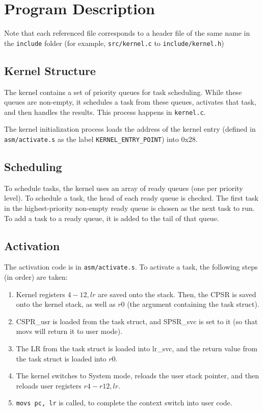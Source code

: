 \documentclass{article}
\begin{document}
\section{Program Description}
Note that each referenced file corresponds to a header file of the same name in the \verb|include| folder (for example, \verb|src/kernel.c| to \verb|include/kernel.h|)
\subsection{Kernel Structure}
The kernel contains a set of priority queues for task scheduling. While these queues are non-empty, it schedules a task from these queues, activates that task, and then handles the results. This process happens in \verb|kernel.c|.

The kernel initialization process loads the address of the kernel entry (defined in \verb|asm/activate.s| as the label \verb|KERNEL_ENTRY_POINT|) into $0$x$28$.
\subsection{Scheduling}

To schedule tasks, the kernel uses an array of ready queues (one per priority level). To schedule a task, the head of each ready queue is checked. The first task in the highest-priority non-empty ready queue is chosen as the next task to run. 
To add a task to a ready queue, it is added to the tail of that queue.

\subsection{Activation}
The activation code is in \verb|asm/activate.s|. To activate a task, the following steps (in order) are taken:
\begin{enumerate}
\item Kernel registers $4-12, lr$ are saved onto the stack. Then, the CPSR is saved onto the kernel stack, as well as $r0$ (the argument containing the task struct).
\item CSPR\_usr is loaded from the task struct, and SPSR\_svc is set to it (so that movs will return it to user mode).
\item The LR from the task struct is loaded into lr\_svc, and the return value from the task struct is loaded into $r0$.
\item The kernel switches to System mode, reloads the user stack pointer, and then reloads user registers $r4-r12, lr$.
\item \verb|movs pc, lr| is called, to complete the context switch into user code.
\end{enumerate}
\end{document}
